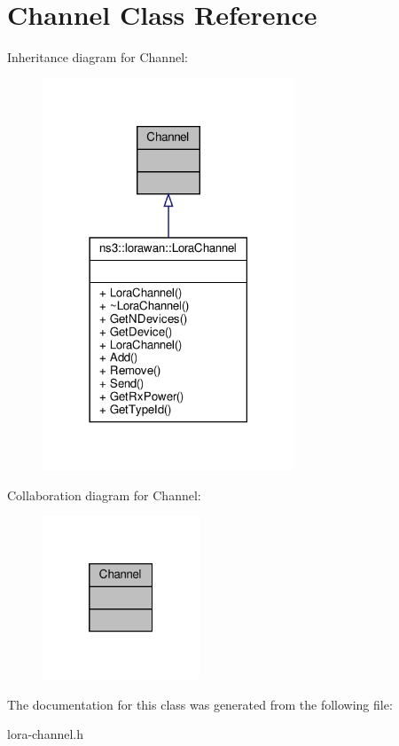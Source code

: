 \hypertarget{classChannel}{}\section{Channel Class Reference}
\label{classChannel}


Inheritance diagram for Channel\+:
\nopagebreak
\begin{figure}[H]
\begin{center}
\leavevmode
\includegraphics[width=213pt]{classChannel__inherit__graph}
\end{center}
\end{figure}


Collaboration diagram for Channel\+:
\nopagebreak
\begin{figure}[H]
\begin{center}
\leavevmode
\includegraphics[width=133pt]{classChannel__coll__graph}
\end{center}
\end{figure}


The documentation for this class was generated from the following file\+:\begin{DoxyCompactItemize}
\item 
lora-\/channel.\+h\end{DoxyCompactItemize}
